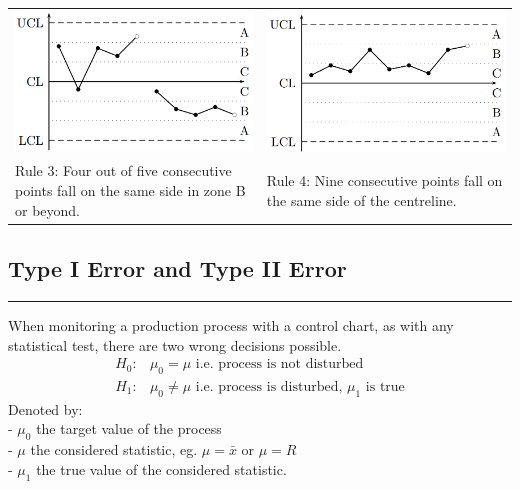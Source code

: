 \begin{table}[H]
\begin{tabular}{p{}@{\hskip 1em}p{}}
    \includegraphics[width=\linewidth]{Pics/3.1.3.png}& \includegraphics[width=\linewidth]{Pics/3.1.4.png} \\
    Rule 3: Four out of five consecutive points fall on the same side in zone B or beyond. &
    Rule 4: Nine consecutive points fall on the same side of the centreline.
  \end{tabular}
\end{table}

\subsection{Type I Error and Type II Error}
\noindent\rule[\linienAbstand]{\linewidth}{\linienDicke}
When monitoring a production process with a control chart, as with any statistical test, there are two wrong decisions possible.
\begin{equation}
  \begin{split}
    H_0:& \mu_0 = \mu \text{ i.e. process is not disturbed}\\
    H_1:& \mu_0 \neq \mu \text{ i.e. process is disturbed, } \mu_1 \text{ is true}
  \end{split}
\end{equation}
Denoted by:\\
 - $\mu_0$ the target value of the process\\
 - $\mu$ the considered statistic, eg. $\mu = \bar{x}$ or $\mu = R$\\
 - $\mu_1$ the true value of the considered statistic.\\

